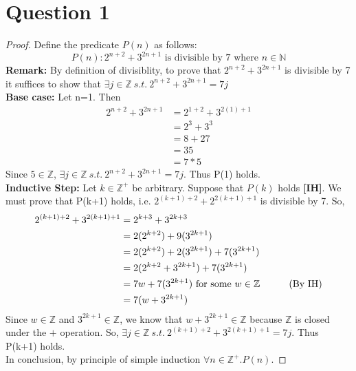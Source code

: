 \documentclass[12pt]{article}
\begin{document}
\section*{Question 1}
\begin{proof} %
Define the predicate $P(n)$ as follows:
$$P(n): 2^{n+2} + 3^{2n+1} \text{ is divisible by 7 where $n \in \mathbb{N}$}$$
\textbf{Remark:}  By definition of divisiblity, to prove that $2^{n+2} + 3^{2n+1}$ is divisible
by 7 it suffices to show that $ \exists j \in \mathbb{Z} \ s.t. \ 2^{n+2} + 3^{2n+1} = 7j $ \\
\textbf{Base case:} Let n=1. Then
\begin{align*}
2^{n+2} + 3^{2n+1}
& = 2^{1+2} + 3^{2(1)+1} \\
& = 2^3 + 3^3 \\
& = 8 + 27  \\
& = 35  \\
& = 7 * 5
\end{align*}
\indent Since $5 \in \mathbb{Z}$, $ \exists j \in \mathbb{Z} \ s.t. \ 2^{n+2} + 3^{2n+1} = 7j $.
Thus P(1) holds. \\
\textbf{Inductive Step:}
Let $k \in \mathbb{Z}^{+}$ be arbitrary. Suppose that $P(k)$ holds \textbf{[IH]}. We must prove
that P(k+1) holds, i.e. $2^{(k+1)+2} + 2^{2(k+1)+1}$ is divisible by 7. So, \\
\begin{align*}
2^{(k+1)+2} + 3^{2(k+1) +1} &=2^{k+3} + 3^{2k +3} \\
&=2(2^{k+2}) + 9(3^{2k+1})\\
&=2(2^{k+2}) + 2(3^{2k+1}) + 7(3^{2k+1})\\
&=2(2^{k+2} + 3^{2k+1}) + 7(3^{2k+1})\\
&=7w + 7(3^{2k+1}) \text{ for some $w\in\mathbb{Z} $\indent\indent (By IH)}\\
&=7(w + 3^{2k+1})
\end{align*}
Since $w \in \mathbb{Z}$ and $3^{2k+1} \in \mathbb{Z}$, we know that
$w + 3^{2k+1} \in \mathbb{Z}$ because $\mathbb{Z }$ is closed under
the $+$ operation. So, $\exists j \in \mathbb{Z} \ s.t. \ 2^{(k+1)+2} + 3^{2(k+1)+1} = 7j$. Thus
P(k+1) holds. \\

In conclusion, by principle of simple induction $ \forall n \in \mathbb{Z}^+ . P(n). $
\end{proof}
\end{document}
